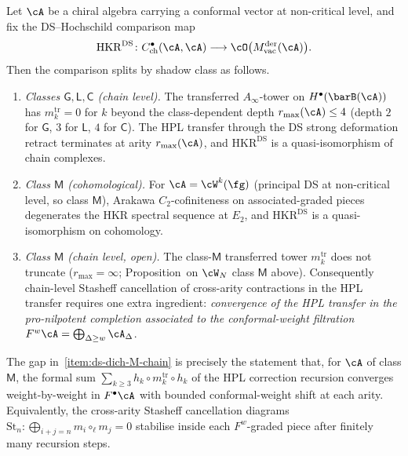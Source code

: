\begin{proposition}%
\label{prop:ds-hochschild-class-dichotomy}%
%
%
Let $\cA$ be a chiral algebra carrying a conformal vector at
non-critical level, and fix the DS--Hochschild comparison map
\[
\mathrm{HKR}^{\mathrm{DS}}\colon
C^\bullet_{\mathrm{ch}}(\cA,\cA)\longrightarrow
\cO\bigl(M_{\mathrm{vac}}^{\mathrm{der}}(\cA)\bigr).
\]
Then the comparison splits by shadow class as follows.
\begin{enumerate}[label=\textup{(\roman*)}]
\item\label{item:ds-dich-GLC} \emph{Classes $\mathsf{G},\mathsf{L},\mathsf{C}$
 (chain level).} The transferred $A_\infty$-tower on
 $H^\bullet(\barB(\cA))$ has $m_k^{\mathrm{tr}}=0$ for $k$ beyond the
 class-dependent depth $r_{\max}(\cA)\le 4$ (depth $2$ for $\mathsf{G}$,
 $3$ for $\mathsf{L}$, $4$ for $\mathsf{C}$). The HPL transfer through
 the DS strong deformation retract terminates at arity $r_{\max}(\cA)$,
 and $\mathrm{HKR}^{\mathrm{DS}}$ is a quasi-isomorphism of chain
 complexes.
\item\label{item:ds-dich-M-coh} \emph{Class $\mathsf{M}$ (cohomological).}
 For $\cA=\cW^k(\fg)$ (principal DS at non-critical level, so class
 $\mathsf{M}$), Arakawa $C_2$-cofiniteness on associated-graded pieces
 degenerates the HKR spectral sequence at $E_2$, and
 $\mathrm{HKR}^{\mathrm{DS}}$ is a quasi-isomorphism on cohomology.
\item\label{item:ds-dich-M-chain} \emph{Class $\mathsf{M}$ (chain level, open).}
 The class-$\mathsf{M}$ transferred tower $m_k^{\mathrm{tr}}$ does not
 truncate ($r_{\max}=\infty$; Proposition~on $\cW_N$ class $\mathsf M$
 above). Consequently chain-level Stasheff cancellation of cross-arity
 contractions in the HPL transfer requires one extra ingredient:
 \emph{convergence of the HPL transfer in the pro-nilpotent completion
 associated to the conformal-weight filtration}
 $F^w\cA=\bigoplus_{\Delta\ge w}\cA_\Delta$.
\end{enumerate}
The gap in~\ref{item:ds-dich-M-chain} is precisely the statement that,
for $\cA$ of class $\mathsf{M}$, the formal sum
$\sum_{k\ge 3} h_k\circ m_k^{\mathrm{tr}}\circ h_k$ of the HPL
correction recursion converges weight-by-weight in $F^\bullet\cA$ with
bounded conformal-weight shift at each arity. Equivalently, the
cross-arity Stasheff cancellation diagrams
$\mathrm{St}_n\colon \bigoplus_{i+j=n}m_i\circ_\ell m_j=0$ stabilise
inside each $F^w$-graded piece after finitely many recursion steps.
\end{proposition}

